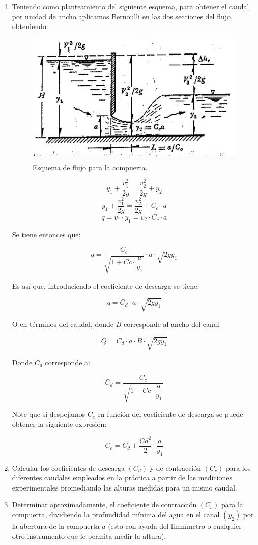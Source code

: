 \documentclass[10pt, a4paper]{exam}
\begin{document}
\begin{enumerate}

    \item Teniendo como planteamiento del siguiente esquema, para obtener el caudal por unidad de ancho aplicamos Bernoulli en las dos secciones del flujo, obteniendo:

    \begin{figure}[h]
        \centering
        \includegraphics[width=0.5\linewidth]{Images/compuer.png}
        \caption{Esquema de flujo para la compuerta.}
        \label{}
    \end{figure}

    $$y_1+\dfrac{v^2_1}{2g}=\dfrac{v^2_2}{2g}+y_2$$
    $$y_1+\dfrac{v^2_1}{2g}=\dfrac{v^2_2}{2g}+C_c \cdot a$$
    $$q=v_1\cdot y_1=v_2\cdot C_c \cdot a$$

    Se tiene entonces que:

    $$q=\dfrac{C_c}{\sqrt{1+Cc \cdot\dfrac{a}{y_1}}}\cdot a \cdot  \sqrt{2gy_1}$$

    Es así que, introduciendo el coeficiente de descarga se tiene:

    $$q=C_d \cdot a \cdot \sqrt{2gy_1}$$ 

    O en términos del caudal, donde $B$ corresponde al ancho del canal

    $$Q=C_d \cdot a \cdot B \cdot \sqrt{2gy_1}$$ 

    Donde $C_d$ corresponde a:

    $$C_d=\dfrac{C_c}{\sqrt{1+Cc \cdot\dfrac{a}{y_1}}}$$

    Note que si despejamos $C_c$ en función del coeficiente de descarga se puede obtener la siguiente expresión:

    $$C_c=C_d+\dfrac{Cd^2}{2}\cdot\dfrac{a}{y_1}$$

    \item Calcular los coeficientes de descarga $(C_d)$ y de contracción $(C_c)$ para los diferentes caudales empleados en la práctica a partir de las mediciones experimentales promediando las alturas medidas para un mismo caudal.
    
    \item Determinar aproximadamente, el coeficiente de contracción $(C_c)$ para la compuerta, dividiendo la profundidad mínima del agua en el canal $(y_2)$ por la abertura de la compuerta $a$ (esto con ayuda del limnímetro o cualquier otro instrumento que le permita medir la altura).


\end{enumerate}
\end{document}
